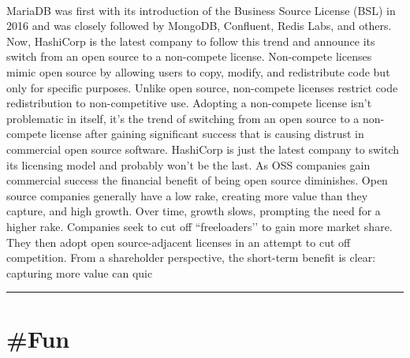 \documentclass[10pt,a4paper]{article}
\begin{document}
\begin{multicols*}{2}
\paragraph{}
 MariaDB was first with its introduction of the Business Source License (BSL) in 2016 and was closely followed by MongoDB, Confluent, Redis Labs, and others. Now, HashiCorp is the latest company to follow this trend and announce its switch from an open source to a non-compete license.
Non-compete licenses mimic open source by allowing users to copy, modify, and redistribute code but only for specific purposes. Unlike open source, non-compete licenses restrict code redistribution to non-competitive use. Adopting a non-compete license isn’t problematic in itself, it’s the trend of switching from an open source to a non-compete license after gaining significant success that is causing distrust in commercial open source software.
HashiCorp is just the latest company to switch its licensing model and probably won’t be the last. As OSS companies gain commercial success the financial benefit of being open source diminishes. Open source companies generally have a low rake, creating more value than they capture, and high growth. Over time, growth slows, prompting the need for a higher rake. Companies seek to cut off “freeloaders’’ to gain more market share. They then adopt open source-adjacent licenses in an attempt to cut off competition. From a shareholder perspective, the short-term benefit is clear: capturing more value can quic
\par\noindent\textcolor{red}{\rule{\linewidth}{0.2mm}}
\vfill
\null
\end{multicols*}

\newpage
\section{\#Fun}
\end{document}
